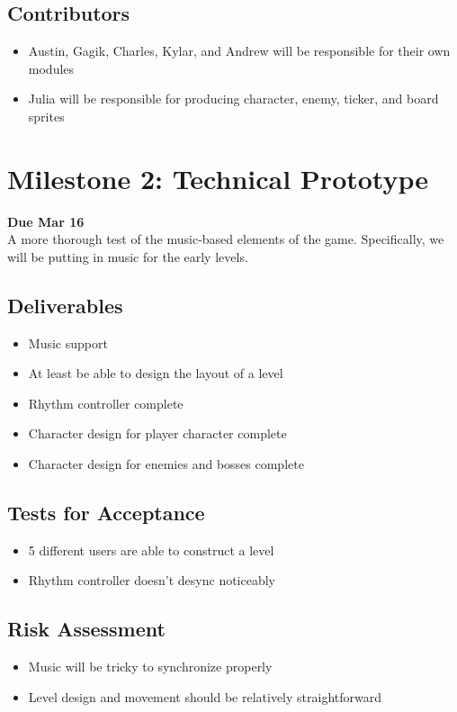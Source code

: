 \documentclass[]{article}
\begin{document}
\subsection*{Contributors}
\begin{itemize}
  \item Austin, Gagik, Charles, Kylar, and Andrew will be responsible 
    for their own modules
  \item Julia will be responsible for producing character, enemy, ticker, 
    and board sprites
\end{itemize}

\pagebreak
\section*{Milestone 2: Technical Prototype}
\noindent\textbf{Due Mar 16}\\
A more thorough test of the music-based elements of the game. 
Specifically, we will be putting in music for the early levels.
\subsection*{Deliverables}
\begin{itemize}
\item Music support
\item At least be able to design the layout of a level
\item Rhythm controller complete
\item Character design for player character complete
\item Character design for enemies and bosses complete
\end{itemize}
\subsection*{Tests for Acceptance}
\begin{itemize}
\item 5 different users are able to construct a level
\item Rhythm controller doesn't desync noticeably
\end{itemize}
\subsection*{Risk Assessment}
\begin{itemize}
\item Music will be tricky to synchronize properly
\item Level design and movement should be relatively straightforward
\end{itemize}
\end{document}
